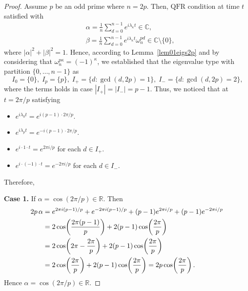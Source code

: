 \documentclass[10pt,a4paper]{amsart}
\newcommand{\QFR}{\mathrm{QFR}}
\begin{document}
\begin{proof}
Assume $p$ be an odd prime where $n=2p$. Then, $\QFR$ condition at time $t$ satisfied with 
  \begin{equation}~\label{eqq2Thm2revivaltime}
  \begin{aligned}
&\alpha = \frac{1}{n}\sum_{d=0}^{n-1} e^{i\lambda_{\kappa} t} \in \mathbb{C},\\
& \beta  = \frac{1}{n}\sum_{d=0}^{n-1} e^{i\lambda_{\kappa} t}\omega_n^{pd} \in \mathbb{C}\setminus\{0\},
  \end{aligned}
  \end{equation}
  where $|\alpha|^2 + |\beta|^2 = 1.$ Hence, according to Lemma~\ref{lem01eigs2p} and by considering that $\omega_n^{p\kappa}=(-1)^{\kappa}$, we established  that the eigenvalue type with partition $\{0, \ldots, n-1\}$ as
  \begin{equation}~\label{eqq3Thm2revivaltime}
   I_0 = \{0\},\; I_p = \{p\},\; I_+ = \{d : \gcd(d,2p)=1\},\; I_- = \{d : \gcd(d,2p)=2\},      
  \end{equation}
  where the terms holds in case $|I_+|=|I_-|=p-1$. Thus, we noticed that at $t = 2\pi/p$ satisfying 
  \begin{itemize}
    \item $e^{i\lambda_0 t} = e^{i(p-1)\cdot 2\pi/p}$.
    \item $e^{i\lambda_p t} = e^{-i(p-1)\cdot 2\pi/p}$.
    \item $e^{i\cdot 1 \cdot t} = e^{2\pi i/p}$ for each $d \in I_+$.
    \item $e^{i\cdot(-1)\cdot t} = e^{-2\pi i/p}$ for each $d \in I_-$.
  \end{itemize}
Therefore, 

\textbf{Case 1.} If $\alpha = \cos(2\pi/p) \in \mathbb{R}$. Then
  \begin{align*}
    2p\,\alpha &= e^{2\pi i(p-1)/p} + e^{-2\pi i(p-1)/p}
                 + (p-1)e^{2\pi i/p} + (p-1)e^{-2\pi i/p} \notag\\
               &= 2\cos\!\left(\frac{2\pi(p-1)}{p}\right) + 2(p-1)\cos\!\left(\frac{2\pi}{p}\right)\notag\\
               &= 2\cos\!\left(2\pi - \frac{2\pi}{p}\right) + 2(p-1)\cos\!\left(\frac{2\pi}{p}\right)\notag\\
               &= 2\cos\!\left(\frac{2\pi}{p}\right) + 2(p-1)\cos\!\left(\frac{2\pi}{p}\right)
                = 2p\cos\!\left(\frac{2\pi}{p}\right).
  \end{align*}
  Hence $\alpha = \cos(2\pi/p) \in \mathbb{R}$. 


\end{proof}
\end{document}
